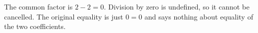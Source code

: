 The common factor is $ 2-2=0 $. Division by zero is undefined, so it cannot be cancelled. The original equality is just $ 0=0 $ and says nothing about equality of the two coefficients.
